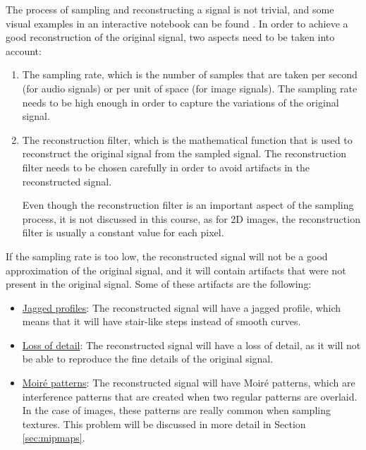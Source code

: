 The process of sampling and reconstructing a signal is not trivial, and some visual examples in an interactive notebook can be found . In order to achieve a good reconstruction of the original signal, two aspects need to be taken into account:
\begin{enumerate}
    \item The sampling rate, which is the number of samples that are taken per second (for audio signals) or per unit of space (for image signals). The sampling rate needs to be high enough in order to capture the variations of the original signal.
    \item The reconstruction filter, which is the mathematical function that is used to reconstruct the original signal from the sampled signal. The reconstruction filter needs to be chosen carefully in order to avoid artifacts in the reconstructed signal.
    
    Even though the reconstruction filter is an important aspect of the sampling process, it is not discussed in this course, as for 2D images, the reconstruction filter is usually a constant value for each pixel.
\end{enumerate}

If the sampling rate is too low, the reconstructed signal will not be a good approximation of the original signal, and it will contain artifacts that were not present in the original signal. Some of these artifacts are the following:
\begin{itemize}
    \item \ul{Jagged profiles}: The reconstructed signal will have a jagged profile, which means that it will have stair-like steps instead of smooth curves.
    \item \ul{Loss of detail}: The reconstructed signal will have a loss of detail, as it will not be able to reproduce the fine details of the original signal.
    \item \ul{Moiré patterns}: The reconstructed signal will have Moiré patterns, which are interference patterns that are created when two regular patterns are overlaid. In the case of images, these patterns are really common when sampling textures. This problem will be discussed in more detail in Section \ref{sec:mipmaps}.
\end{itemize}

